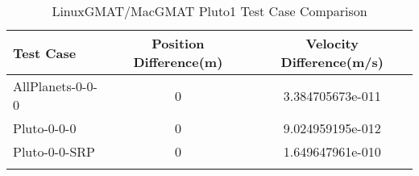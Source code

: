 \begin{table}[htbp!]
\centering
\caption{ LinuxGMAT/MacGMAT Pluto1 Test Case Comparison}
      \begin{tabular}{lcc}
      \hline\hline
          Test Case & Position Difference(m) & Velocity Difference(m/s) \\
         \hline
         AllPlanets-0-0-0 & 0 & 3.384705673e-011 \\
         Pluto-0-0-0 & 0 & 9.024959195e-012 \\
         Pluto-0-0-SRP & 0 & 1.649647961e-010 \\
      \hline\hline
      \label{Table: Pluto1 LinuxGMAT-MacGMAT Table} 
\end{tabular}
\end{table}
